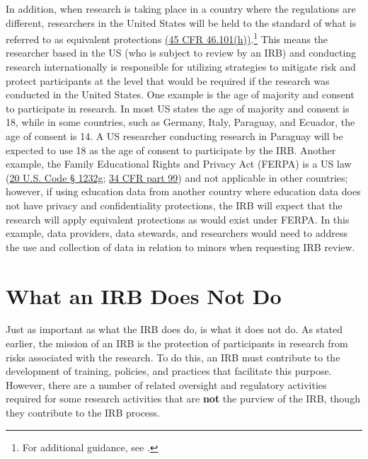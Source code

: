 In addition, when research is taking place in a country where the regulations are different, researchers in the United States will be held to the standard of what is referred to as equivalent protections \href{https://www.law.cornell.edu/cfr/text/45/46.101}{(45 CFR 46.101(h))}.\footnote{For additional guidance, see \citet{officeforhumanresearchprotections2016a}.} This means the researcher based in the US (who is subject to review by an IRB) and conducting research internationally is responsible for utilizing strategies to mitigate risk and protect participants at the level that would be required if the research was conducted in the United States. One example is the age of majority and consent to participate in research. In most US states the age of majority and consent is 18, while in some countries, such as Germany, Italy, Paraguay, and Ecuador, the age of consent is 14. A US researcher conducting research in Paraguay will be expected to use 18 as the age of consent to participate by the IRB. Another example, the Family Educational Rights and Privacy Act (FERPA) is a US law (\href{https://www.law.cornell.edu/uscode/text/20/1232g}{20 U.S. Code § 1232g}; \href{https://www.law.cornell.edu/cfr/text/34/part-99}{34 CFR part 99}) and not applicable in other countries; however, if using education data from another country where education data does not have privacy and confidentiality protections, the IRB will expect that the research will apply equivalent protections as would exist under FERPA. In this example, data providers, data stewards, and researchers would need to address the use and collection of data in relation to minors when requesting IRB review.

\hypertarget{what-an-irb-does-not-do}{%
\section{What an IRB Does Not Do}\label{what-an-irb-does-not-do}}

Just as important as what the IRB does do, is what it does not do. As stated earlier, the mission of an IRB is the protection of participants in research from risks associated with the research. To do this, an IRB must contribute to the development of training, policies, and practices that facilitate this purpose. However, there are a number of related oversight and regulatory activities required for some research activities that are \textbf{not} the purview of the IRB, though they contribute to the IRB process.

